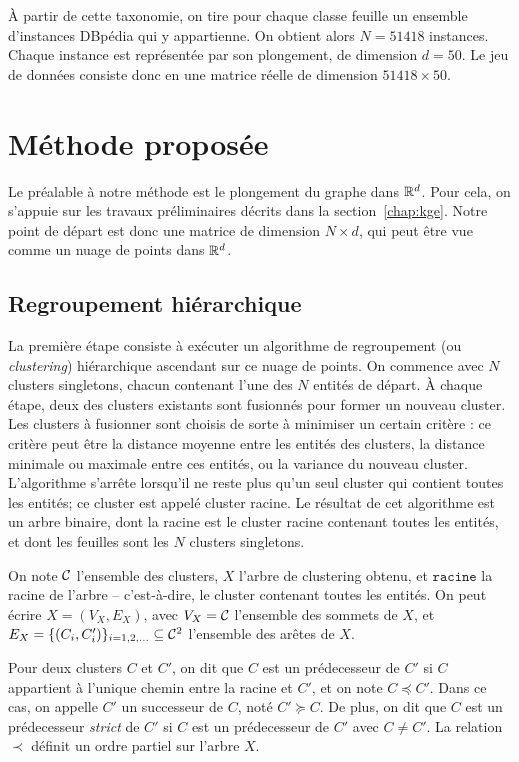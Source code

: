 À partir de cette taxonomie, on tire pour chaque classe feuille un ensemble d'instances DBpédia qui y appartienne. On obtient alors $N=51 418$  instances. Chaque instance est représentée par son plongement, de dimension $d=50$. Le jeu de données consiste donc en une matrice réelle de dimension $51 418 \times 50$.

\section{Méthode proposée}
\label{sec:te-method}
Le préalable à notre méthode est le plongement du graphe dans $\mathbb{R}^d$. Pour cela, on s'appuie sur les travaux préliminaires décrits dans la section~\ref{chap:kge}.
Notre point de départ est donc une matrice de dimension $N \times d$, qui peut être vue comme un nuage de points dans $\mathbb{R}^d$.

\subsection{Regroupement hiérarchique}
\label{subsec:te-clustering}
La première étape consiste à exécuter un algorithme de regroupement (ou \textit{clustering}) hiérarchique ascendant sur ce nuage de points. 
On commence avec $N$ clusters singletons, chacun contenant l'une des $N$ entités de départ. À chaque étape, deux des clusters existants sont fusionnés pour former un nouveau cluster. Les clusters à fusionner sont choisis de sorte à minimiser un certain critère : ce critère peut être la distance moyenne entre les entités des clusters, la distance minimale ou maximale entre ces entités, ou la variance du nouveau cluster. 
L'algorithme s'arrête lorsqu'il ne reste plus qu'un seul cluster qui contient toutes les entités; ce cluster est appelé cluster racine. Le résultat de cet algorithme est un arbre binaire, dont la racine est le cluster racine contenant toutes les entités, et dont les feuilles sont les $N$ clusters singletons.

On note $\mathcal{C}$ l'ensemble des clusters, $X$ l'arbre de clustering obtenu, et $\texttt{racine}$ la racine de l'arbre – c'est-à-dire, le cluster contenant toutes les entités. On peut écrire $X = (V_X, E_X)$, avec $V_X = \mathcal{C}$ l'ensemble des sommets de $X$, et $E_X = \{(C_i, C_i')\}_{i = 1, 2, \ldots } \subseteq \mathcal{C}^2$ l'ensemble des arêtes de $X$.

Pour deux clusters $C$ et $C'$, on dit que $C$ est un prédecesseur de $C'$ si $C$ appartient à l'unique chemin entre la racine et $C'$, et on note $C \preceq C'$. Dans ce cas, on appelle $C'$ un successeur de $C$, noté $C' \succeq C$. De plus, on dit que $C$ est un prédecesseur \textit{strict} de $C'$ si $C$ est un prédecesseur de $C'$ avec $C \neq C'$. La relation $\prec$ définit un ordre partiel sur l'arbre $X$.

